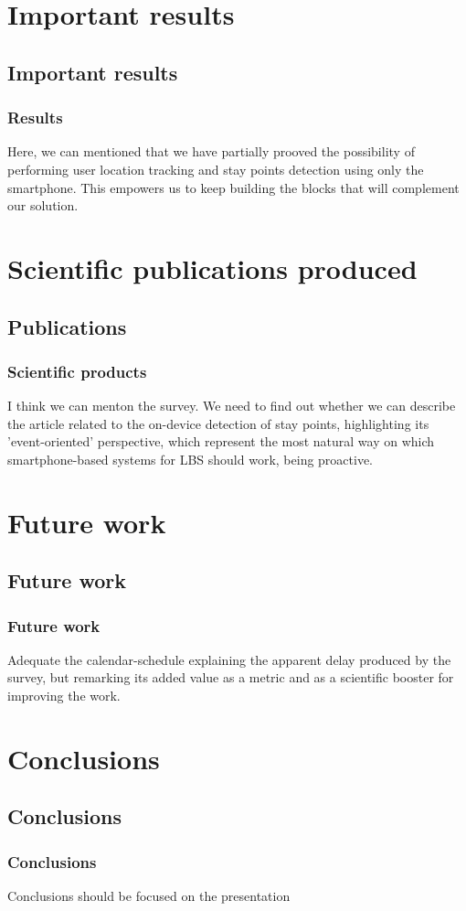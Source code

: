 \documentclass[compress,9pt,xcolor={dvipsnames,table}]{beamer}
\begin{document}
\section{Important results}
\subsection{Important results}
\label{sub:important_results}
\begin{frame}[t]\frametitle{Results}
    


Here, we can mentioned that we have partially prooved the possibility of performing user location tracking and stay points detection using only the smartphone.
This empowers us to keep building the blocks that will complement our solution.
\end{frame}

\section{Scientific publications produced}
\subsection{Publications}
\begin{frame}[t]\frametitle{Scientific products}
I think we can menton the survey.
We need to find out whether we can describe the article related to the on-device detection of stay points, highlighting its 'event-oriented' perspective, which represent the most natural way on which smartphone-based systems for LBS should work, being proactive.
\end{frame}


\section{Future work}
\subsection{Future work}
\begin{frame}[t]\frametitle{Future work}
    
Adequate the calendar-schedule explaining the apparent delay produced by the survey, but remarking its added value as a metric and as a scientific booster for improving the work.
\end{frame}


\section{Conclusions}
\subsection{Conclusions}
\label{sub:conclusions}
\begin{frame}[t]\frametitle{Conclusions}
Conclusions should be focused on the presentation
\end{frame}
\end{document}

